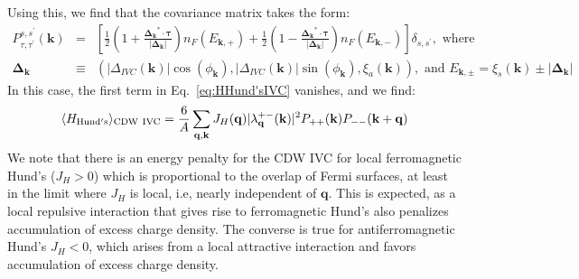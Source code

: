 \documentclass[aps,pra,twocolumn,superscriptaddress,10pt,article,nofootinbib,showpacs,longbibliography]{revtex4-1}
\def \k{{\mathbf k}}
\def \q{{\mathbf q}}
\def \beq{\begin{eqnarray}}
\def \eeq{\end{eqnarray}}
\def \nn{\nonumber \\}
\begin{document}
Using this, we find that the covariance matrix takes the form:
\beq
P_{\tau,\tau^\prime}^{s,s^\prime}(\k) &=&  \left[ \frac{1}{2}\left( 1 + \frac{\bm{\Delta_\k}^* \cdot \bm{\tau}}{|\bm{\Delta_\k|}} \right) n_F(E_{\k,+}) + \frac{1}{2}\left( 1 - \frac{\bm{\Delta_\k}^* \cdot \bm{\tau}}{|\bm{\Delta_\k|}} \right) n_F(E_{\k,-}) \right]\delta_{s,s^\prime}, \text{ where } \nn
\bm{\Delta_\k} &\equiv& \left( |\Delta_{IVC}(\k)| \cos(\phi_\k), |\Delta_{IVC}(\k)| \sin(\phi_\k),  \xi_a(\k) \right), \text{ and } E_{\k, \pm} = \xi_s(\k) \pm |\bm{\Delta_\k}|
\eeq
In this case, the first term in Eq.~\eqref{eq:HHund'sIVC} vanishes, and we find:
\beq
\langle H_{\rm Hund's} \rangle_{\rm CDW ~IVC} = \frac{6}{A} \sum_{\q, \k} J_H(\q) |\lambda^{+-}_{\q}(\k)|^2 P_{++}(\k) P_{--}(\k+\q)
\eeq
We note that there is an energy penalty for the CDW IVC for local ferromagnetic Hund's ($J_H > 0$) which is proportional to the overlap of Fermi surfaces, at least in the limit where $J_H$ is local, i.e, nearly independent of $\q$. 
This is expected, as a local repulsive interaction that gives rise to ferromagnetic Hund's also penalizes accumulation of excess charge density. 
The converse is true for antiferromagnetic Hund's $J_H < 0$, which arises from a local attractive interaction and favors accumulation of excess charge density. 
\end{document}
